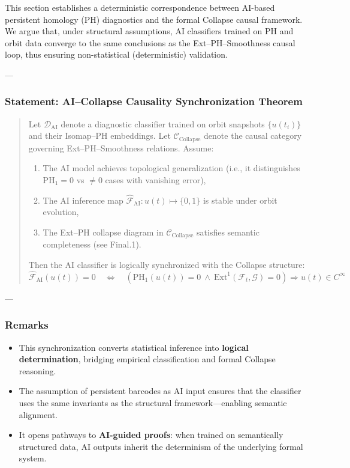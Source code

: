 \documentclass[11pt]{article}
\begin{document}
\begin{axiom}
\begin{axiom}
{{This section establishes a deterministic correspondence  
between AI-based persistent homology (PH) diagnostics  
and the formal Collapse causal framework.  
We argue that, under structural assumptions,  
AI classifiers trained on PH and orbit data converge  
to the same conclusions as the Ext–PH–Smoothness causal loop,  
thus ensuring non-statistical (deterministic) validation.

---

\subsubsection*{Statement: AI–Collapse Causality Synchronization Theorem}

\begin{quote}
Let \( \mathcal{D}_{\text{AI}} \) denote a diagnostic classifier trained on orbit snapshots \( \{u(t_i)\} \)  
and their Isomap–PH embeddings.  
Let \( \mathcal{C}_{\text{Collapse}} \) denote the causal category governing Ext–PH–Smoothness relations.  
Assume:

\begin{enumerate}
  \item The AI model achieves topological generalization (i.e., it distinguishes \( \mathrm{PH}_1 = 0 \) vs \( \neq 0 \) cases with vanishing error),
  \item The AI inference map \( \widehat{\mathcal{F}}_{\text{AI}}: u(t) \mapsto \{0,1\} \) is stable under orbit evolution,
  \item The Ext–PH collapse diagram in \( \mathcal{C}_{\text{Collapse}} \) satisfies semantic completeness (see Final.1).
\end{enumerate}

Then the AI classifier is logically synchronized with the Collapse structure:
\[
\widehat{\mathcal{F}}_{\text{AI}}(u(t)) = 0 \quad \Leftrightarrow \quad
\left( \mathrm{PH}_1(u(t)) = 0 \ \wedge \ \mathrm{Ext}^1(\mathcal{F}_t, \mathcal{G}) = 0 \right)
\Rightarrow u(t) \in C^\infty
\]
\end{quote}

---

\subsubsection*{Remarks}

\begin{itemize}
  \item This synchronization converts statistical inference into \textbf{logical determination},  
  bridging empirical classification and formal Collapse reasoning.
  \item The assumption of persistent barcodes as AI input ensures that the classifier uses the same invariants  
  as the structural framework—enabling semantic alignment.
  \item It opens pathways to \textbf{AI-guided proofs}: when trained on semantically structured data,  
  AI outputs inherit the determinism of the underlying formal system.
\end{itemize}

}}
\end{axiom}
\end{axiom}
\end{document}
